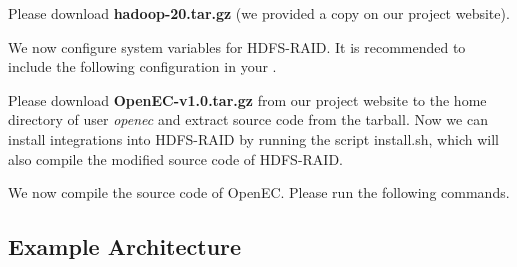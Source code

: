 \documentclass[letterpaper,12pt]{article}
\newcommand{\openec}{{\sf\small OpenEC}\xspace}
\begin{document}
Please download {\bf hadoop-20.tar.gz} (we provided a copy on our project website).

\begin{center}
\noindent{}
\end{center}

We now configure system variables for HDFS-RAID. It is recommended to include the following
configuration in your .

\begin{center}
\noindent{}
\end{center}

Please download {\bf OpenEC-v1.0.tar.gz} from our project website to the home directory of user {\sl openec}
and extract source code from the tarball. Now we can install integrations into HDFS-RAID by running
the script install.sh, which will also compile the modified source code of HDFS-RAID.

\begin{center}
\noindent{}
\end{center}

We now compile the source code of \openec. Please run the following commands.

\begin{center}
\noindent{}
\end{center}

\subsection{Example Architecture}
\end{document}
